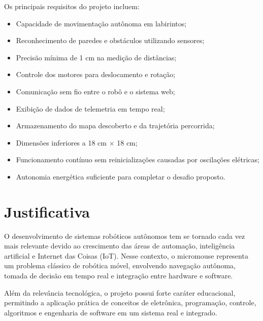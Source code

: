 Os principais requisitos do projeto incluem:

\begin{itemize}
    \item Capacidade de movimentação autônoma em labirintos;
    
    \item Reconhecimento de paredes e obstáculos utilizando sensores;
    
    \item Precisão mínima de 1 cm na medição de distâncias;
    
    \item Controle dos motores para deslocamento e rotação;
    
    \item Comunicação sem fio entre o robô e o sistema web;
    
    \item Exibição de dados de telemetria em tempo real;
    
    \item Armazenamento do mapa descoberto e da trajetória percorrida;
    
    \item Dimensões inferiores a 18 cm $\times$ 18 cm;
    
    \item Funcionamento contínuo sem reinicializações causadas por oscilações elétricas;
    
    \item Autonomia energética suficiente para completar o desafio proposto.
\end{itemize}

\section{Justificativa}

O desenvolvimento de sistemas robóticos autônomos tem se tornado cada vez mais relevante devido ao crescimento das áreas de automação, inteligência artificial e Internet das Coisas (IoT). Nesse contexto, o micromouse representa um problema clássico de robótica móvel, envolvendo navegação autônoma, tomada de decisão em tempo real e integração entre hardware e software.

Além da relevância tecnológica, o projeto possui forte caráter educacional, permitindo a aplicação prática de conceitos de eletrônica, programação, controle, algoritmos e engenharia de software em um sistema real e integrado.

